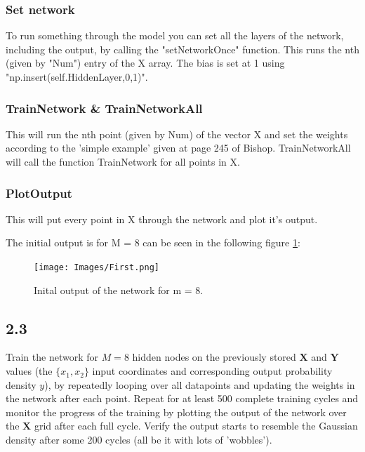 \documentclass[a4paper]{article}
\begin{document}
\subsubsection*{Set network}
To run something through the model you can set all the layers of the network, including the output, by calling the "setNetworkOnce" function. This runs the nth (given by "Num") entry of the X array. The bias is set at 1 using "np.insert(self.HiddenLayer,0,1)".

\subsubsection*{TrainNetwork \& TrainNetworkAll}

This will run the nth point (given by Num) of the vector X and set the weights according to the 'simple example' given at page 245 of Bishop. TrainNetworkAll will call the function TrainNetwork for all points in X.

\subsubsection*{PlotOutput}

This will put every point in X through the network and plot it's output. 


The initial output is for M = 8 can be seen in the following figure \ref{First}:

\begin{figure}[H]
\texttt{[image: Images/First.png]}
\caption{Inital output of the network for m = 8.}
\label{First}
\end{figure}






\subsection*{2.3}

Train the network for $M = 8$ hidden nodes on the previously stored $\textbf{X}$ and $\textbf{Y}$ values (the $\{ x_1, x_2 \}$ input coordinates and corresponding output probability density $y$), by repeatedly looping over all datapoints and updating the weights in the network after each point. Repeat for at least 500 complete training cycles and monitor the progress of the training by plotting the output of the network over the $\textbf{X}$ grid after each full cycle. Verify the output starts to resemble the Gaussian density after some 200 cycles (all be it with lots of 'wobbles').\\
\end{document}
